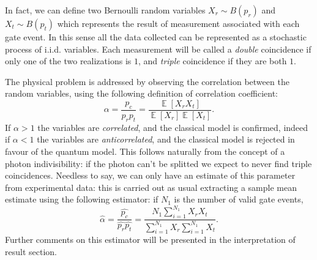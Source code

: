 \documentclass[10pt, final]{article}
\DeclareMathOperator{\E}{\mathbb{E}}
\begin{document}
\begin{multicols}{2}
In fact, we can define two Bernoulli random variables $X_r \sim B(p_r)$ and $X_t \sim B(p_t)$ which represents the result of measurement associated with each gate event. In this sense all the data collected can be represented as a stochastic process of i.i.d. variables. Each measurement will be called a \emph{double} coincidence if only one of the two realizations is $1$, and \emph{triple} coincidence if they are both $1$. 

The physical problem is addressed by observing the correlation between the random variables, using the following definition of correlation coefficient: 
\begin{equation*}
    \alpha = \frac{p_c}{p_r p_t} = \frac{\E[X_r X_t]}{\E[X_r]\E[X_t]}.
\end{equation*}
If $\alpha > 1$ the variables are \emph{correlated}, and the classical model is confirmed, indeed if $\alpha < 1$ the variables are \emph{anticorrelated}, and the classical model is rejected in favour of the quantum model. This follows naturally from the concept of a photon indivisibility: if the photon can't be splitted we expect to never find triple coincidences.
Needless to say, we can only have an estimate of this parameter from experimental data: this is carried out as usual extracting a sample mean estimate using the following estimator: if $N_1$ is the number of valid gate events,
\begin{equation*}
    \hat{\alpha} = \frac{\hat{p_c}}{\hat{p_r} \hat{p_t}} = \frac{N_1 \sum_{i=1}^{N_1} X_r X_t}{\sum_{i=1}^{N_1} X_r\sum_{i=1}^{N_1} X_t}.
\end{equation*}
Further comments on this estimator will be presented in the interpretation of result section.

\end{multicols}
\end{document}
